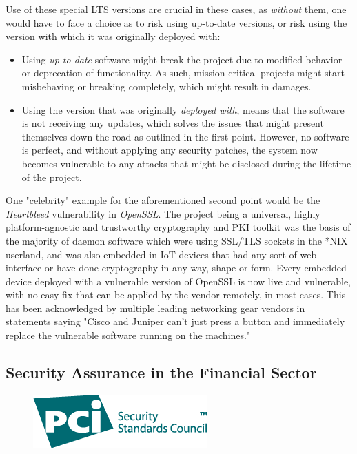 \documentclass[a4paper,12pt]{article}
\begin{document}
	Use of these special LTS versions are crucial in these cases, as \textit{without} them, one would have to face a choice as to risk using up-to-date versions, or risk using the version with which it was originally deployed with:
	
	\begin{itemize}
		\item Using \textit{up-to-date} software might break the project due to modified behavior or deprecation of functionality. As such, mission critical projects might start misbehaving or breaking completely, which might result in damages.
		\item Using the version that was originally \textit{deployed with}, means that the software is not receiving any updates, which solves the issues that might present themselves down the road as outlined in the first point. However, no software is perfect, and without applying any security patches, the system now becomes vulnerable to any attacks that might be disclosed during the lifetime of the project.
	\end{itemize}
	
	One "celebrity" example for the aforementioned second point would be the \textit{Heartbleed} vulnerability in \textit{OpenSSL}. The project being a universal, highly platform-agnostic and trustworthy cryptography and PKI toolkit was the basis of the majority of daemon software which were using SSL/TLS sockets in the *NIX userland, and was also embedded in IoT devices that had any sort of web interface or have done cryptography in any way, shape or form. Every embedded device deployed with a vulnerable version of OpenSSL is now live and vulnerable, with no easy fix that can be applied by the vendor remotely, in most cases. This has been acknowledged by multiple leading networking gear vendors in statements saying "Cisco and Juniper can't just press a button and immediately replace the vulnerable software running on the machines."\cite{jpaglier14}
	
\subsection{Security Assurance in the Financial Sector}

	\begin{figure}
		\vspace{-11pt}
		\centering
		\includegraphics[scale=0.5]{pci.png}
	\end{figure}
\end{document}
